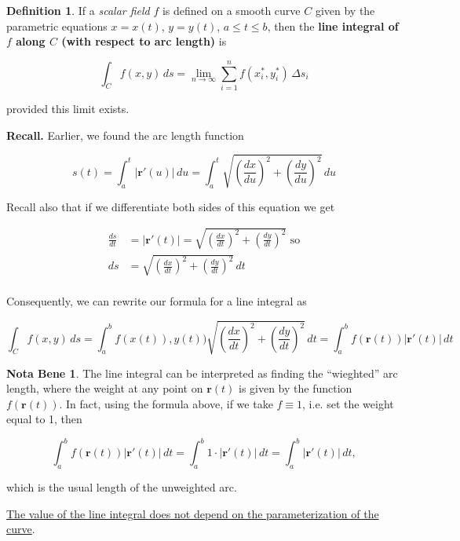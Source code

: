 \documentclass[11pt,oneside,english]{amsart}
\theoremstyle{definition}
\newtheorem*{definition}{Definition}
\newtheorem*{note}{Nota Bene}
\newcommand{\lom}[2]{\lim_{{#1}\rightarrow{#2}}}
\newcommand{\dd}[2]{\frac{d{#1}}{d{#2}}}
\begin{document}
\begin{definition}
If a \textit{scalar field} $f$ is defined on a smooth curve $C$ given by the parametric equations $x=x(t)$, $y=y(t)$, $a\leq t\leq b$, then the \textbf{line integral of $f$ along $C$ (with respect to arc length)} is 

\[
\int_Cf(x,y)\,ds=\lom{n}{\infty}\sum_{i=1}^nf(x_i^*,y_i^*)\,\Delta s_i
\]

provided this limit exists.
\end{definition}


\textbf{Recall.} Earlier, we found the arc length function 

\[
s(t)=\int_a^t|\mathbf{r}'(u)|\,du=\int_a^t\sqrt{\left(\dd{x}{u}\right)^2+\left(\dd{y}{u}\right)^2}\,du
\]

Recall also that if we differentiate both sides of this equation we get

\begin{align*}
\dd{s}{t}&=|\mathbf{r}'(t)|=\sqrt{\left(\dd{x}{t}\right)^2+\left(\dd{y}{t}\right)^2}\text{ so}\\[2mm]
ds&=\sqrt{\left(\dd{x}{t}\right)^2+\left(\dd{y}{t}\right)^2}\,dt\\[2mm]
\end{align*}

Consequently, we can rewrite our formula for a line integral as



\[\boxed{
\int_Cf(x,y)\,ds=\int_a^bf(x(t)),y(t))\sqrt{\left(\dd{x}{t}\right)^2+\left(\dd{y}{t}\right)^2}\,dt=\int_a^bf(\mathbf{r}(t))|\mathbf{r}'(t)|\,dt
}\]



\begin{note}
The line integral can be interpreted as finding the ``wieghted'' arc length, where the weight at any point on $\mathbf{r}(t)$ is given by the function $f(\mathbf{r}(t))$. In fact, using the formula above, if we take $f\equiv 1$, i.e. set the weight equal to 1, then 

\[
\int_a^bf(\mathbf{r}(t))|\mathbf{r}'(t)|\,dt=\int_a^b1\cdot|\mathbf{r}'(t)|\,dt=\int_a^b|\mathbf{r}'(t)|\,dt,
\]

which is the usual length of the unweighted arc.

\uline{The value of the line integral does not depend on the parameterization of the curve}.
\end{note}
\end{document}
